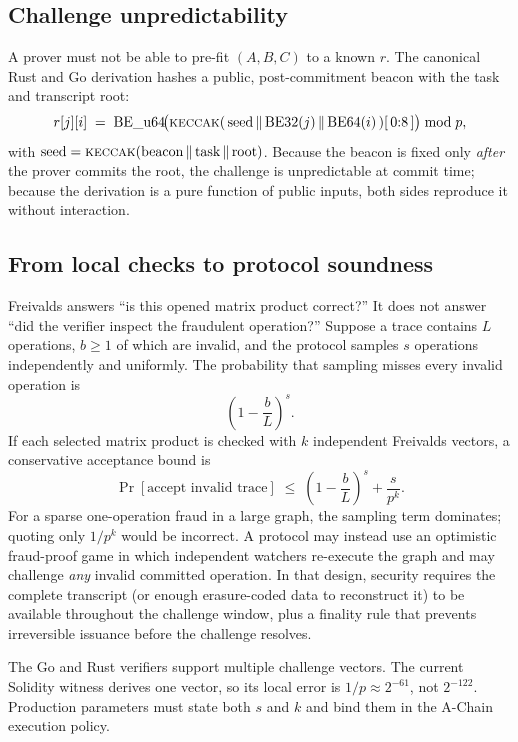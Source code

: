 \documentclass[11pt,a4paper]{article}
\begin{document}
\subsection{Challenge unpredictability}

A prover must not be able to pre-fit $(A,B,C)$ to a known $r$. The canonical Rust and Go derivation hashes a public, post-commitment beacon with the task and transcript root:
\[
  r[j][i] \;=\; \mathrm{BE\_u64}\!\big(\textsc{keccak}(\,\text{seed} \,\|\, \mathrm{BE32}(j) \,\|\, \mathrm{BE64}(i)\,)[\,0{:}8\,]\big) \bmod p,
\]
with $\text{seed} = \textsc{keccak}(\text{beacon} \,\|\, \text{task} \,\|\, \text{root})$. Because the beacon is fixed only \emph{after} the prover commits the root, the challenge is unpredictable at commit time; because the derivation is a pure function of public inputs, both sides reproduce it without interaction.

\subsection{From local checks to protocol soundness}\label{sec:coverage}

Freivalds answers ``is this opened matrix product correct?'' It does not answer ``did the verifier inspect the fraudulent operation?'' Suppose a trace contains $L$ operations, $b \ge 1$ of which are invalid, and the protocol samples $s$ operations independently and uniformly. The probability that sampling misses every invalid operation is
\[
  \left(1-\frac{b}{L}\right)^s .
\]
If each selected matrix product is checked with $k$ independent Freivalds vectors, a conservative acceptance bound is
\[
  \Pr[\text{accept invalid trace}]
  \;\le\;
  \left(1-\frac{b}{L}\right)^s + \frac{s}{p^k}.
\]
For a sparse one-operation fraud in a large graph, the sampling term dominates; quoting only $1/p^k$ would be incorrect. A protocol may instead use an optimistic fraud-proof game in which independent watchers re-execute the graph and may challenge \emph{any} invalid committed operation. In that design, security requires the complete transcript (or enough erasure-coded data to reconstruct it) to be available throughout the challenge window, plus a finality rule that prevents irreversible issuance before the challenge resolves.

The Go and Rust verifiers support multiple challenge vectors. The current Solidity witness derives one vector, so its local error is $1/p \approx 2^{-61}$, not $2^{-122}$. Production parameters must state both $s$ and $k$ and bind them in the A-Chain execution policy.
\end{document}
